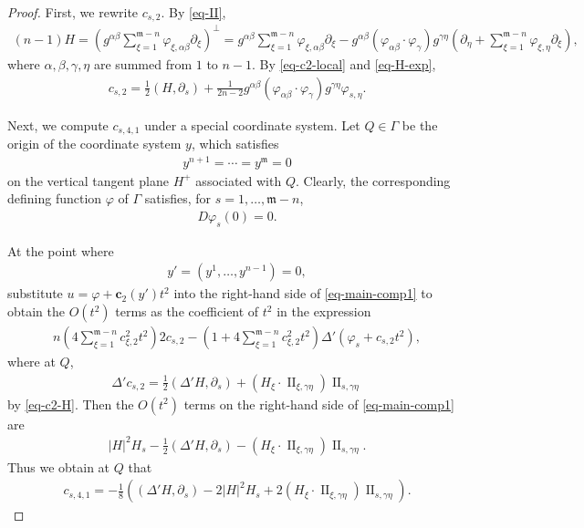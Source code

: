 \documentclass[10pt,a4paper]{amsart}
\newcommand{\fm}{\mathfrak{m}}
\begin{document}
\begin{proof}
    First, we rewrite \(c_{s,2}\). By \eqref{eq-II},
\begin{align}\label{eq-H-exp}
    (n-1)H = \left(g^{\alpha\beta}\sum_{\xi=1}^{\fm-n} \varphi_{\xi, \alpha\beta}\partial_{\xi}\right)^\perp
    = g^{\alpha\beta}\sum_{\xi=1}^{\fm-n} \varphi_{\xi, \alpha\beta}\partial_{\xi}
    - g^{\alpha\beta} (\varphi_{\alpha\beta}\cdot \varphi_\gamma)g^{\gamma\eta}\left(\partial_\eta+ \sum_{\xi=1}^{\fm-n} \varphi_{\xi, \eta} \partial_{\xi}\right),
\end{align}
where \(\alpha, \beta, \gamma, \eta\) are summed from \(1\) to \(n-1\). By \eqref{eq-c2-local} and \eqref{eq-H-exp},
\begin{align}\label{eq-c2-H}
    c_{s,2} = \frac{1}{2}(H, \partial_s) +\frac{1}{2n-2} g^{\alpha\beta} (\varphi_{\alpha\beta}\cdot \varphi_\gamma)g^{\gamma\eta}\varphi_{s, \eta}.
\end{align}

Next, we compute \(c_{s, 4,1}\) under a special coordinate system. Let \(Q\in \Gamma\) be the origin of the coordinate system \(y\), which satisfies
\begin{align}
    y^{n+1} = \cdots = y^\fm = 0
\end{align}
on the vertical tangent plane \(H^+\) associated with \(Q\). Clearly, the corresponding defining function \(\varphi\) of \(\Gamma\) satisfies, for \(s=1,\dots, \fm-n\),
\begin{align}\label{eq-Dvarphi-0}
    D\varphi_s (0) = 0.
\end{align}

At the point where
\begin{align}
    y' = (y^1,\dots, y^{n-1}) = 0,
\end{align}
substitute \(u = \varphi + \mathbf{c}_2(y') t^2\) into the right-hand side of \eqref{eq-main-comp1} to obtain the \(O(t^2)\) terms as the coefficient of \(t^2\) in the expression
\begin{align}
    n\left(4\sum_{\xi=1}^{\fm-n} c_{\xi, 2}^2t^2\right)2c_{s,2}
    - \left(1+4 \sum_{\xi=1}^{\fm-n} c_{\xi,2}^2 t^2\right)\Delta' \left(\varphi_s +c_{s,2}t^2\right),
\end{align}
where at \(Q\),
\begin{align}
    \Delta' c_{s,2} = \frac{1}{2}(\Delta'H,\partial_s) + (H_{\xi} \cdot \operatorname{II}_{\xi,\gamma\eta}) \operatorname{II}_{s,\gamma\eta}
\end{align}
by \eqref{eq-c2-H}. Then the \(O(t^2)\) terms on the right-hand side of \eqref{eq-main-comp1} are
\begin{align}\label{eq-c-4-RHS}
    |H|^2 H_s - \frac{1}{2}(\Delta'H,\partial_s) - (H_{\xi} \cdot \operatorname{II}_{\xi,\gamma\eta}) \operatorname{II}_{s,\gamma\eta}.
\end{align}
Thus we obtain at \(Q\) that
\begin{align}\label{eq-c41-Q}
    c_{s,4,1} = -\frac{1}{8} \left( (\Delta'H,\partial_s)-2|H|^2 H_s + 2(H_{\xi} \cdot \operatorname{II}_{\xi,\gamma\eta}) \operatorname{II}_{s,\gamma\eta}\right).
\end{align}


\end{proof}
\end{document}
